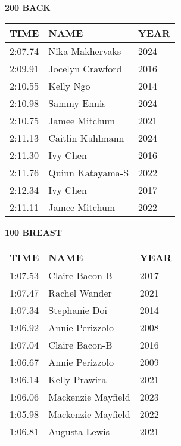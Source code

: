 \begin{table}[H]
\centering
\begin{minipage}[t]{0.48\textwidth}
\centering
\textbf{200 BACK}\\[0.1cm]
\begin{tabular}{@{}p{1.8cm}p{2.8cm}p{1.2cm}@{}}
\hline
    \textbf{TIME} & \textbf{NAME} & \textbf{YEAR} \\
\hline
    2:07.74 & Nika Makhervaks & 2024 \\
    2:09.91 & Jocelyn Crawford & 2016 \\
    2:10.55 & Kelly Ngo & 2014 \\
    2:10.98 & Sammy Ennis & 2024 \\
    2:10.75 & Jamee Mitchum & 2021 \\
    2:11.13 & Caitlin Kuhlmann & 2024 \\
    2:11.30 & Ivy Chen & 2016 \\
    2:11.76 & Quinn Katayama-S & 2022 \\
    2:12.34 & Ivy Chen & 2017 \\
    2:11.11 & Jamee Mitchum & 2022 \\
\hline
\end{tabular}
\end{minipage}\hfill
\begin{minipage}[t]{0.48\textwidth}
\centering
\textbf{100 BREAST}\\[0.1cm]
\begin{tabular}{@{}p{1.8cm}p{2.8cm}p{1.2cm}@{}}
\hline
    \textbf{TIME} & \textbf{NAME} & \textbf{YEAR} \\
\hline
    1:07.53 & Claire Bacon-B & 2017 \\
    1:07.47 & Rachel Wander & 2021 \\
    1:07.34 & Stephanie Doi & 2014 \\
    1:06.92 & Annie Perizzolo & 2008 \\
    1:07.04 & Claire Bacon-B & 2016 \\
    1:06.67 & Annie Perizzolo & 2009 \\
    1:06.14 & Kelly Prawira & 2021 \\
    1:06.06 & Mackenzie Mayfield & 2023 \\
    1:05.98 & Mackenzie Mayfield & 2022 \\
    1:06.81 & Augusta Lewis & 2021 \\
\hline
\end{tabular}
\end{minipage}
\end{table}

